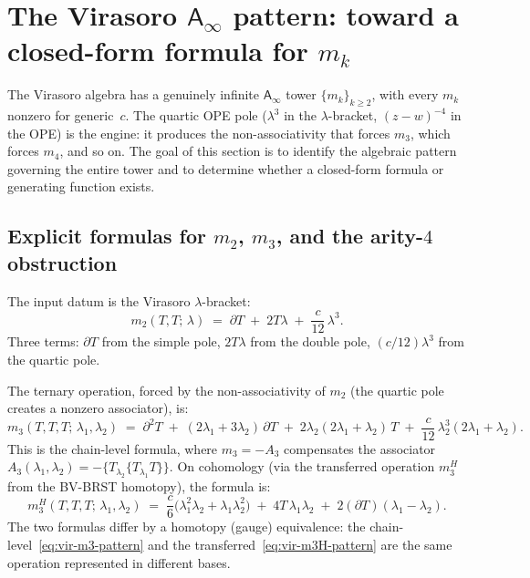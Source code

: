 \documentclass[11pt]{article}
\newcommand{\Ainf}{\mathsf{A}_{\infty}}
\begin{document}
\section{The Virasoro $\Ainf$ pattern: toward a closed-form formula for $m_k$}
\label{sec:virasoro-ainf-pattern}

The Virasoro algebra has a genuinely infinite $\Ainf$ tower
$\{m_k\}_{k \ge 2}$, with every $m_k$ nonzero for generic~$c$.
The quartic OPE pole ($\lambda^3$ in the $\lambda$-bracket,
$(z-w)^{-4}$ in the OPE) is the engine: it produces the
non-associativity that forces $m_3$, which forces $m_4$, and so on.
The goal of this section is to identify the algebraic pattern
governing the entire tower and to determine whether a closed-form
formula or generating function exists.

\subsection*{Explicit formulas for $m_2$, $m_3$, and the arity-$4$ obstruction}

The input datum is the Virasoro $\lambda$-bracket:
\begin{equation}\label{eq:vir-m2-pattern}
m_2(T,T;\,\lambda)
\;=\;
\partial T \;+\; 2T\lambda \;+\; \frac{c}{12}\,\lambda^3.
\end{equation}
Three terms: $\partial T$ from the simple pole, $2T\lambda$ from
the double pole, $(c/12)\lambda^3$ from the quartic pole.

The ternary operation, forced by the non-associativity of $m_2$
(the quartic pole creates a nonzero associator), is:
\begin{equation}\label{eq:vir-m3-pattern}
m_3(T,T,T;\,\lambda_1,\lambda_2)
\;=\;
\partial^2 T
\;+\; (2\lambda_1 + 3\lambda_2)\,\partial T
\;+\; 2\lambda_2(2\lambda_1 + \lambda_2)\,T
\;+\; \frac{c}{12}\,\lambda_2^3(2\lambda_1 + \lambda_2).
\end{equation}
This is the chain-level formula, where $m_3 = -A_3$ compensates the
associator $A_3(\lambda_1,\lambda_2)
= -\{T_{\lambda_2}\{T_{\lambda_1} T\}\}$.
On cohomology (via the transferred operation $m_3^H$ from the BV-BRST
homotopy), the formula is:
\begin{equation}\label{eq:vir-m3H-pattern}
m_3^H(T,T,T;\,\lambda_1,\lambda_2)
\;=\;
\frac{c}{6}\bigl(\lambda_1^2\lambda_2
+ \lambda_1\lambda_2^2\bigr)
\;+\; 4T\,\lambda_1\lambda_2
\;+\; 2(\partial T)(\lambda_1 - \lambda_2).
\end{equation}
The two formulas differ by a homotopy (gauge) equivalence:
the chain-level~\eqref{eq:vir-m3-pattern} and the
transferred~\eqref{eq:vir-m3H-pattern} are the same operation
represented in different bases.
\end{document}
